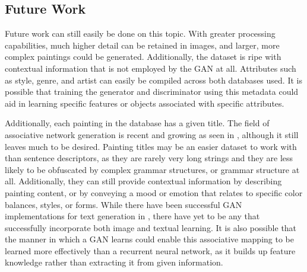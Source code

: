 \documentclass[10pt,twocolumn,letterpaper]{article}
\begin{document}
\subsection{Future Work}
Future work can still easily be done on this topic. With greater processing capabilities, much higher detail can be retained in images, and larger, more complex paintings could be generated. Additionally, the dataset is ripe with contextual information that is not employed by the GAN at all. Attributes such as style, genre, and artist can easily be compiled across both databases used. It is possible that training the generator and discriminator using this metadata could aid in learning specific features or objects associated with specific attributes.

Additionally, each painting in the database has a given title. The field of associative network generation is recent and growing as seen in \cite{ishibashi2018associative}, although it still leaves much to be desired. Painting titles may be an easier dataset to work with than sentence descriptors, as they are rarely very long strings and they are less likely to be obfuscated by complex grammar structures, or grammar structure at all. Additionally, they can still provide contextual information by describing painting content, or by conveying a mood or emotion that relates to specific color balances, styles, or forms. While there have been successful GAN implementations for text generation in \cite{zhang2017adversarial}, there have yet to be any that successfully incorporate both image and textual learning. It is also possible that the manner in which a GAN learns could enable this associative mapping to be learned more effectively than a recurrent neural network, as it builds up feature knowledge rather than extracting it from given information.

{\small


}
\end{document}
